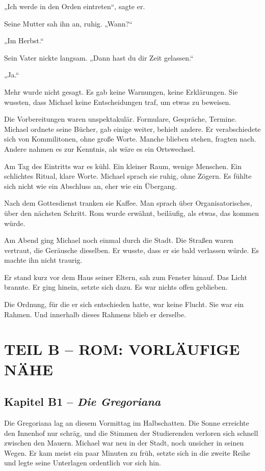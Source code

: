\documentclass[
]{article}
\begin{document}
„Ich werde in den Orden eintreten``, sagte er.

Seine Mutter sah ihn an, ruhig. „Wann?{\kern0pt}``

„Im Herbst.``

Sein Vater nickte langsam. „Dann hast du dir Zeit gelassen.``

„Ja.``

Mehr wurde nicht gesagt. Es gab keine Warnungen, keine Erklärungen. Sie wussten, dass Michael keine Entscheidungen traf, um etwas zu beweisen.

Die Vorbereitungen waren unspektakulär. Formulare, Gespräche, Termine. Michael ordnete seine Bücher, gab einige weiter, behielt andere. Er verabschiedete sich von Kommilitonen, ohne große Worte. Manche blieben stehen, fragten nach. Andere nahmen es zur Kenntnis, als wäre es ein Ortswechsel.

Am Tag des Eintritts war es kühl. Ein kleiner Raum, wenige Menschen. Ein schlichtes Ritual, klare Worte. Michael sprach sie ruhig, ohne Zögern. Es fühlte sich nicht wie ein Abschluss an, eher wie ein Übergang.

Nach dem Gottesdienst tranken sie Kaffee. Man sprach über Organisatorisches, über den nächsten Schritt. Rom wurde erwähnt, beiläufig, als etwas, das kommen würde.

Am Abend ging Michael noch einmal durch die Stadt. Die Straßen waren vertraut, die Geräusche dieselben. Er wusste, dass er sie bald verlassen würde. Es machte ihn nicht traurig.

Er stand kurz vor dem Haus seiner Eltern, sah zum Fenster hinauf. Das Licht brannte. Er ging hinein, setzte sich dazu. Es war nichts offen geblieben.

Die Ordnung, für die er sich entschieden hatte, war keine Flucht. Sie war ein Rahmen. Und innerhalb dieses Rahmens blieb er derselbe.

\section{TEIL B -- ROM: VORLÄUFIGE NÄHE}\label{teil-b-rom-vorluxe4ufige-nuxe4he}

\subsection{\texorpdfstring{Kapitel B1 -- \emph{Die Gregoriana}}{Kapitel B1 -- Die Gregoriana}}\label{kapitel-b1-die-gregoriana}

Die Gregoriana lag an diesem Vormittag im Halbschatten. Die Sonne erreichte den Innenhof nur schräg, und die Stimmen der Studierenden verloren sich schnell zwischen den Mauern. Michael war neu in der Stadt, noch unsicher in seinen Wegen. Er kam meist ein paar Minuten zu früh, setzte sich in die zweite Reihe und legte seine Unterlagen ordentlich vor sich hin.
\end{document}
